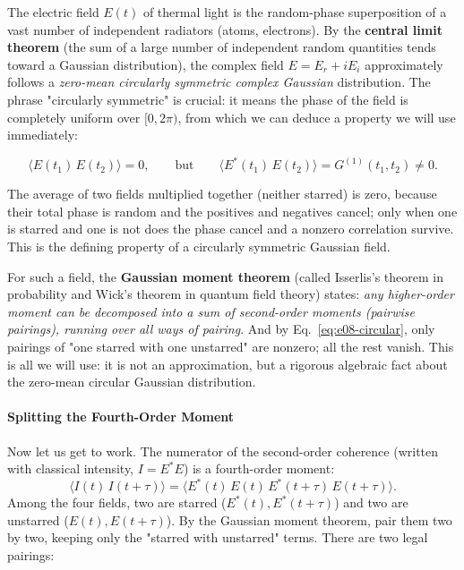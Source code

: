 The electric field \(E(t)\) of thermal light is the random-phase superposition of a vast number of independent radiators (atoms, electrons). By the \textbf{central limit theorem} (the sum of a large number of independent random quantities tends toward a Gaussian distribution), the complex field \(E=E_r+iE_i\) approximately follows a \emph{zero-mean circularly symmetric complex Gaussian} distribution. The phrase "circularly symmetric" is crucial: it means the phase of the field is completely uniform over \([0,2\pi)\), from which we can deduce a property we will use immediately:

\begin{equation}
  \langle E(t_1)\,E(t_2)\rangle=0,
  \qquad\text{but}\qquad
  \langle E^*(t_1)\,E(t_2)\rangle=G^{(1)}(t_1,t_2)\neq0.
  \label{eq:e08-circular}
\end{equation}
\begin{formulaexplain}
The average of two fields multiplied together (neither starred) is zero, because their total phase is random and the positives and negatives cancel; only when one is starred and one is not does the phase cancel and a nonzero correlation survive. This is the defining property of a circularly symmetric Gaussian field.
\end{formulaexplain}

For such a field, the \textbf{Gaussian moment theorem} (called Isserlis's theorem in probability and Wick's theorem in quantum field theory) states: \emph{any higher-order moment can be decomposed into a sum of second-order moments (pairwise pairings), running over all ways of pairing}. And by Eq.~\eqref{eq:e08-circular}, only pairings of "one starred with one unstarred" are nonzero; all the rest vanish. This is all we will use: it is not an approximation, but a rigorous algebraic fact about the zero-mean circular Gaussian distribution.

\paragraph{Splitting the Fourth-Order Moment}
\label{sec:e08-factorize}

Now let us get to work. The numerator of the second-order coherence (written with classical intensity, \(I=E^*E\)) is a fourth-order moment:
\[
  \big\langle I(t)\,I(t+\tau)\big\rangle
  =\big\langle E^*(t)\,E(t)\,E^*(t+\tau)\,E(t+\tau)\big\rangle .
\]
Among the four fields, two are starred (\(E^*(t),E^*(t+\tau)\)) and two are unstarred (\(E(t),E(t+\tau)\)). By the Gaussian moment theorem, pair them two by two, keeping only the "starred with unstarred" terms. There are two legal pairings:


